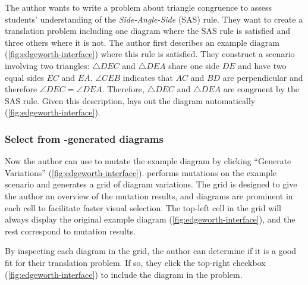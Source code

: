 The author wants to write a problem about triangle congruence to assess students' understanding of the \textit{Side-Angle-Side} (SAS) rule. They want to create a translation problem including one diagram where the SAS rule is satisfied and three others where it is not. The author first describes an example diagram (\cref{fig:edgeworth-interface}) where this rule is satisfied. They construct a scenario involving two triangles: $\triangle DEC$ and $\triangle DEA$ share one side $DE$ and have two equal sides $EC$ and $EA$. $\angle CEB$ indicates that $AC$ and $BD$ are perpendicular and therefore $\angle DEC = \angle DEA$. Therefore, $\triangle DEC$ and $\triangle DEA$ are congruent by the SAS rule. Given this description, \Edgeworth lays out the diagram automatically (\cref{fig:edgeworth-interface}). 


\subsubsection{Select from \Edgeworth-generated diagrams}
\label{sec:select-diagrams}

Now the author can use \Edgeworth to mutate the example diagram by clicking ``Generate Variations'' (\cref{fig:edgeworth-interface}). \Edgeworth performs mutations on the example scenario and generates a grid of diagram variations. The grid is designed to give the author an overview of the mutation results, and diagrams are prominent in each cell to facilitate faster visual selection. The top-left cell in the grid will always display the original example diagram (\cref{fig:edgeworth-interface}), and the rest correspond to mutation results.

By inspecting each diagram in the grid, the author can determine if it is a good fit for their translation problem. If so, they click the top-right checkbox (\cref{fig:edgeworth-interface}) to include the diagram in the problem.

